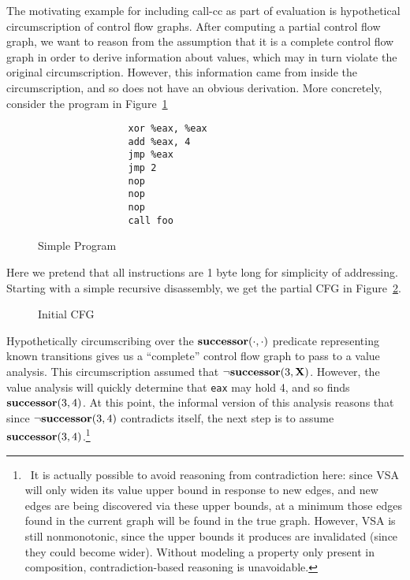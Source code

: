 The motivating example for including call-cc as part of evaluation is hypothetical circumscription of control flow graphs.
After computing a partial control flow graph, we want to reason from the assumption that it is a complete control flow graph in order to derive information about values, which may in turn violate the original circumscription.
However, this information came from inside the circumscription, and so does not have an obvious derivation.
More concretely, consider the program in Figure~\ref{fig:simpprog}
\begin{figure}
        \begin{lstlisting}
                xor %eax, %eax
                add %eax, 4
                jmp %eax
                jmp 2
                nop
                nop
                nop
                call foo
        \end{lstlisting}
        \caption{Simple Program}
\label{fig:simpprog}
\end{figure}
Here we pretend that all instructions are 1 byte long for simplicity of addressing.
Starting with a simple recursive disassembly, we get the partial CFG in Figure~\ref{fig:cfg0}.
\begin{figure}
        \caption{Initial CFG}
\label{fig:cfg0}
\end{figure}
Hypothetically circumscribing over the ${\bf successor}(\cdot, \cdot)$ predicate representing known transitions gives us a ``complete'' control flow graph to pass to a value analysis.
This circumscription assumed that $\neg {\bf successor}(3, {\bf X})$.
However, the value analysis will quickly determine that \texttt{eax} may hold 4, and so finds ${\bf successor}(3, 4)$.
At this point, the informal version of this analysis reasons that since $\neg {\bf successor}(3, 4)$ contradicts itself, the next step is to assume ${\bf successor}(3, 4)$.\footnote{\
        It is actually possible to avoid reasoning from contradiction here: since VSA\cite{vsa} will only widen its value upper bound in response to new edges, and new edges are being discovered via these upper bounds, at a minimum those edges found in the current graph will be found in the true graph.
        However, VSA is still nonmonotonic, since the upper bounds it produces are invalidated (since they could become wider).
        Without modeling a property only present in composition, contradiction-based reasoning is unavoidable.
}

